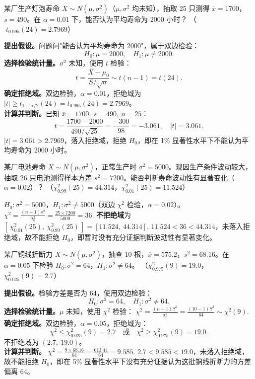 \documentclass[lang=cn,11pt]{elegantbook}
\begin{document}
\begin{exercise}\label{exer:9-t-test-two}
某厂生产灯泡寿命 \(X \sim N(\mu, \sigma^2)\)（\(\mu, \sigma^2\) 均未知），抽取 25 只测得 \(\overline{x}=1700\)，\(s=490\)。在 \(\alpha=0.01\) 下，能否认为平均寿命为 2000 小时？
（\(\;t_{0.995}(24)=2.7969\)）
\end{exercise}
\begin{solution}
\textbf{提出假设。}问题问"能否认为平均寿命为 2000"，属于双边检验：
\[
H_0\colon \mu = 2000,\quad H_1\colon \mu \neq 2000.
\]
\textbf{选择检验统计量。}\(\sigma^2\) 未知，使用 \(t\) 检验：
\[
t = \frac{\overline{X}-\mu_0}{S/\sqrt{n}} \sim t(n-1) = t(24).
\]
\textbf{确定拒绝域。}双边检验，\(\alpha=0.01\)，拒绝域为 \(|t| \geq t_{1-\alpha/2}(24) = t_{0.995}(24)=2.7969\)。\\
\textbf{计算并判断。}已知 \(\overline{x}=1700,\ s=490,\ n=25\)：
\[
t = \frac{1700-2000}{490/\sqrt{25}} = \frac{-300}{98} = -3.061,\quad |t| = 3.061.
\]
\(|t| = 3.061 > 2.7969\)，落入拒绝域，拒绝 \(H_0\)，即在 1\% 显著性水平下不能认为平均寿命为 2000 小时。
\end{solution}




\begin{exercise} \label{ex:ht_chi2_battery}
某厂电池寿命 \(X\sim N(\mu,\sigma^2)\)，正常生产时 \(\sigma^2=5000\)。现因生产条件波动较大，抽取 26 只电池测得样本方差 \(s^2=7200\)。能否判断寿命波动性有显著变化（\(\alpha=0.02\)）？
（\(\chi^2_{0.99}(25)=44.314\)，\(\chi^2_{0.01}(25)=11.524\)）
\end{exercise}
\begin{solution}
\(H_0\colon\sigma^2=5000\)，\(H_1\colon\sigma^2\neq5000\)（双边 \(\chi^2\) 检验，\(\alpha=0.02\)）。
\(
\chi^2=\frac{(n-1)s^2}{\sigma_0^2}=\frac{25\times7200}{5000}=36.
\)
\textbf{不拒绝域}为
\(
[\,\chi^2_{0.01}(25),\ \chi^2_{0.99}(25)\,]=[11.524,\ 44.314].
\)
\(11.524<36<44.314\)，未落入拒绝域，故不能拒绝 \(H_0\)，即暂时没有充分证据判断波动性有显著变化。
\end{solution}

\begin{exercise}\label{exer:9-chi2-two}
某厂铜线折断力 \(X \sim N(\mu, \sigma^2)\)，抽查 10 根，\(\overline{x}=575.2\)，\(s^2=68.16\)。在 \(\alpha=0.05\) 下检验 \(H_0\colon \sigma^2=64\)，\(H_1\colon \sigma^2\neq64\)。
（\(\chi^2_{0.975}(9)=19.0\)，\(\chi^2_{0.025}(9)=2.7\)）
\end{exercise}
\begin{solution}
\textbf{提出假设。}检验方差是否为 64，使用双边检验：
\[
H_0\colon \sigma^2 = 64,\quad H_1\colon \sigma^2 \neq 64.
\]
\textbf{选择检验统计量。}\(\mu\) 未知，使用 \(\chi^2\) 检验：
\(
\chi^2 = \frac{(n-1)S^2}{\sigma_0^2} = \frac{(10-1)S^2}{64} \sim \chi^2(9).
\)
\textbf{确定拒绝域。}双边检验，\(\alpha=0.05\)，拒绝域为：
\[
\chi^2 \leq \chi^2_{0.025}(9) = 2.7 \quad\text{或}\quad \chi^2 \geq \chi^2_{0.975}(9) = 19.0.
\]
不拒绝域为 \((2.7,\ 19.0)\)。\\
\textbf{计算并判断。}
\(
\chi^2 = \frac{9 \times 68.16}{64} = \frac{613.44}{64} = 9.585.
\)
\(2.7 < 9.585 < 19.0\)，未落入拒绝域，故不能拒绝 \(H_0\)，即在 5\% 显著性水平下没有充分证据认为这批铜线折断力的方差偏离 64。
\end{solution}
\end{document}
